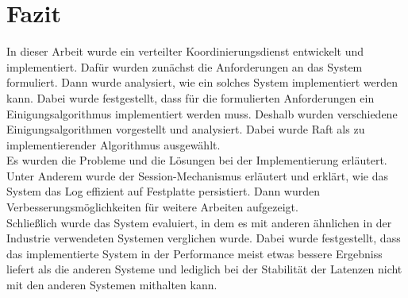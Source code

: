 \chapter{Fazit}

In dieser Arbeit wurde ein verteilter Koordinierungsdienst entwickelt und implementiert. Dafür wurden zunächst die Anforderungen an das System formuliert. Dann wurde analysiert, wie ein solches System implementiert werden kann. Dabei wurde festgestellt, dass für die formulierten Anforderungen ein Einigungsalgorithmus implementiert werden muss. Deshalb wurden verschiedene Einigungsalgorithmen vorgestellt und analysiert. Dabei wurde Raft als zu implementierender Algorithmus ausgewählt. \\
Es wurden die Probleme und die Lösungen bei der Implementierung erläutert. Unter Anderem wurde der Session-Mechanismus erläutert und erklärt, wie das System das Log effizient auf Festplatte persistiert. Dann wurden Verbesserungsmöglichkeiten für weitere Arbeiten aufgezeigt.\\
Schließlich wurde das System evaluiert, in dem es mit anderen ähnlichen in der Industrie verwendeten Systemen verglichen wurde. Dabei wurde festgestellt, dass das implementierte System in der Performance meist etwas bessere Ergebniss liefert als die anderen Systeme und lediglich bei der Stabilität der Latenzen nicht mit den anderen Systemen mithalten kann.